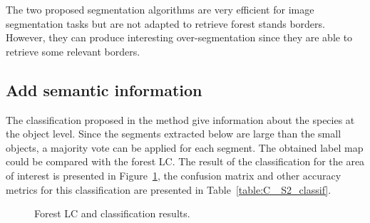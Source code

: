 The two proposed segmentation algorithms are very efficient for image segmentation tasks \citep{guigues2006scale, felzenszwalb2004efficient} but are not adapted to retrieve forest stands borders. However, they can produce interesting over-segmentation since they are able to retrieve some relevant borders.

\subsection{Add semantic information}
The classification proposed in the method give information about the species at the object level. Since the segments extracted below are large than the small objects, a majority vote can be applied for each segment. The obtained label map could be compared with the forest LC.
The result of the classification for the area of interest is presented in Figure~\ref{fig:C3_S2_classif}, the confusion matrix and other accuracy metrics for this classification are presented in Table~\ref{table:C
_S2_classif}.

\begin{figure}[htbp]
\begin{center}
\begingroup
\captionsetup[subfigure]{width=0.375\textwidth}
\hspace*{0.05\textwidth}
\endgroup
\caption{Forest LC and classification results.}
\label{fig:C3_S2_classif}
\end{center}
\end{figure}



